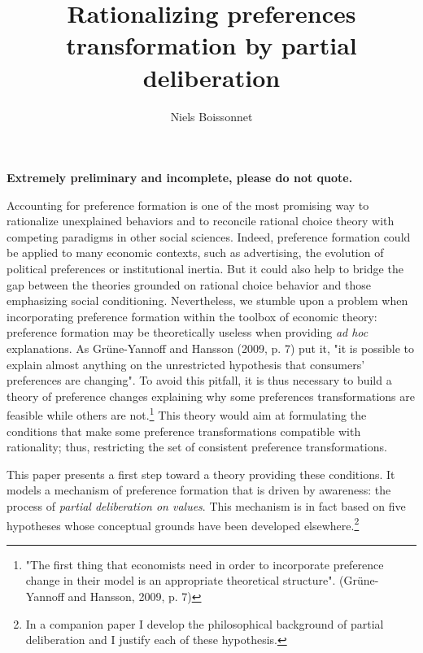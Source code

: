 \documentclass[11pt]{article}
\author{Niels Boissonnet}
\title{Rationalizing preferences transformation by partial deliberation}
\begin{document}
\maketitle

\begin{center}
\large{\textbf{Extremely preliminary and incomplete, please do not quote.}}
\end{center}
\vspace{0,5cm}

Accounting for preference formation is one of the most promising way to rationalize unexplained behaviors and to reconcile rational choice theory with competing paradigms in other social sciences. Indeed, preference formation could be applied to many economic contexts, such as advertising, the evolution of political preferences or institutional inertia. But it could also help to bridge the gap between the theories grounded on rational choice behavior and those emphasizing social conditioning. Nevertheless, we stumble upon a problem when incorporating preference formation within the toolbox of economic theory: preference formation may be theoretically useless when providing \textit{ad hoc }explanations.  As Grüne-Yannoff and Hansson (2009, p. 7) put it, "it is possible to explain almost anything on the unrestricted hypothesis that consumers' preferences are changing". To avoid this pitfall, it is thus necessary to build a theory of preference changes explaining why some preferences transformations are feasible while others are not.\footnote{"The first thing that economists need in order to incorporate preference change in their model is an appropriate theoretical structure". (Grüne-Yannoff and Hansson, 2009, p. 7)} This theory would aim at formulating the conditions that make some preference transformations compatible with rationality; thus, restricting the set of consistent preference transformations. 

 This paper presents a first step toward a theory providing these conditions. It models a mechanism of preference formation that is driven by awareness: the process of \textit{partial deliberation on values}. This mechanism is in fact based on five hypotheses whose conceptual grounds have been developed elsewhere.\footnote{In a companion paper I develop the philosophical background of partial deliberation and I justify each of these hypothesis.}
 
\end{document}
